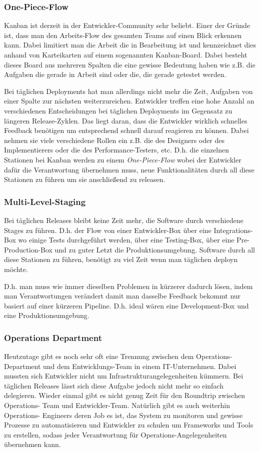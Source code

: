 \subsubsection{One-Piece-Flow}
Kanban ist derzeit in der Entwickler-Community sehr beliebt. Einer der Gründe
ist, dass man den Arbeits-Flow des gesamten Teams auf einen Blick erkennen
kann. Dabei limitiert man die Arbeit die in Bearbeitung ist und kennzeichnet
dies anhand von Karteikarten auf einem sogenannten Kanban-Board. Dabei besteht
dieses Board aus mehreren Spalten die eine gewisse Bedeutung haben wie z.B.
die Aufgaben die gerade in Arbeit sind oder die, die gerade getestet werden.

Bei täglichen Deployments hat man allerdings nicht mehr die Zeit, Aufgaben von
einer Spalte zur nächsten weiterzureichen. Entwickler treffen eine hohe Anzahl
an verschiedenen Entscheidungen bei täglichen Deployments im Gegensatz zu
längeren Release-Zyklen. Das liegt daran, dass die Entwickler wirklich
schnelles Feedback benötigen um entsprechend schnell darauf reagieren zu
können. Dabei nehmen sie viele verschiedene Rollen ein z.B. die des Designers
oder des Implementierers oder die des Performance-Testers, etc. D.h. die
einzelnen Stationen bei Kanban werden zu einem \emph{One-Piece-Flow} wobei der
Entwickler dafür die Verantwortung übernehmen muss, neue Funktionalitäten
durch all diese Stationen zu führen um sie anschließend zu releasen.

\subsubsection{Multi-Level-Staging}
Bei täglichen Releases bleibt keine Zeit mehr, die Software durch verschiedene
Stages zu führen. D.h. der Flow von einer Entwickler-Box über eine
Integrations-Box wo einige Tests durchgeführt werden, über eine Testing-Box,
über eine Pre-Production-Box und zu guter Letzt die Produktionsumgebung.
Software durch all diese Stationen zu führen, benötigt zu viel Zeit wenn man
täglichen deployn möchte.

D.h. man muss wie immer dieselben Problemen in kürzerer dadurch lösen, indem
man Verantwortungen verändert damit man dasselbe Feedback bekommt nur basiert
auf einer kürzeren Pipeline. D.h. ideal wären eine Development-Box und eine
Produktionsumgebung.

\subsubsection{Operations Department}
Heutzutage gibt es noch sehr oft eine Trennung zwischen dem Operations-
Department und dem Entwicklungs-Team in einem IT-Unternehmen. Dabei mussten
sich Entwickler nicht um Infrastrukturangelegenheiten kümmern. Bei täglichen
Releases lässt sich diese Aufgabe jedoch nicht mehr so einfach delegieren.
Wieder einmal gibt es nicht genug Zeit für den Roundtrip zwischen Operations-
Team und Entwickler-Team. Natürlich gibt es auch weiterhin Operations-
Engineers deren Job es ist, das System zu monitoren und gewisse Prozesse zu
automatisieren und Entwickler zu schulen um Frameworks und Tools zu erstellen,
sodass jeder Verantwortung für Operations-Angelegenheiten übernehmen kann.

